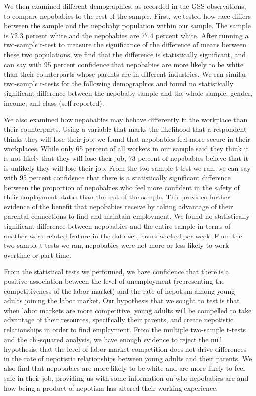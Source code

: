 \documentclass[12pt]{article}
\begin{document}
We then examined different demographics, as recorded in the GSS observations, to compare nepobabies to the rest of the sample. First, we tested how race differs between the sample and the nepobaby population within our sample. The sample is 72.3 percent white and the nepobabies are 77.4 percent white. After running a two-sample t-test to measure the significance of the difference of means between these two populations, we find that the difference is statistically significant, and can say with 95 percent confidence that nepobabies are more likely to be white than their counterparts whose parents are in different industries. We ran similar two-sample t-tests for the following demographics and found no statistically significant difference between the nepobaby sample and the whole sample: gender, income, and class (self-reported).

We also examined how nepobabies may behave differently in the workplace than their counterparts. Using a variable that marks the likelihood that a respondent thinks they will lose their job, we found that nepobabies feel more secure in their workplaces. While only 65 percent of all workers in our sample said they think it is not likely that they will lose their job, 73 percent of nepobabies believe that it is unlikely they will lose their job. From the two-sample t-test we ran, we can say with 95 percent confidence that there is a statistically significant difference between the proportion of nepobabies who feel more confident in the safety of their employment status than the rest of the sample. This provides further evidence of the benefit that nepobabies receive by taking advantage of their parental connections to find and maintain employment. We found no statistically significant difference between nepobabies and the entire sample in terms of another work related feature in the data set, hours worked per week. From the two-sample t-tests we ran, nepobabies were not more or less likely to work overtime or part-time.

From the statistical tests we performed, we have confidence that there is a positive association between the level of unemployment (representing the competitiveness of the labor market) and the rate of nepotism among young adults joining the labor market. Our hypothesis that we sought to test is that when labor markets are more competitive, young adults will be compelled to take advantage of their resources, specifically their parents, and create nepotistic relationships in order to find employment. From the multiple two-sample t-tests and the chi-squared analysis, we have enough evidence to reject the null hypothesis, that the level of labor market competition does not drive differences in the rate of nepotistic relationships between young adults and their parents. We also find that nepobabies are more likely to be white and are more likely to feel safe in their job, providing us with some information on who nepobabies are and how being a product of nepotism has altered their working experience.
\end{document}
